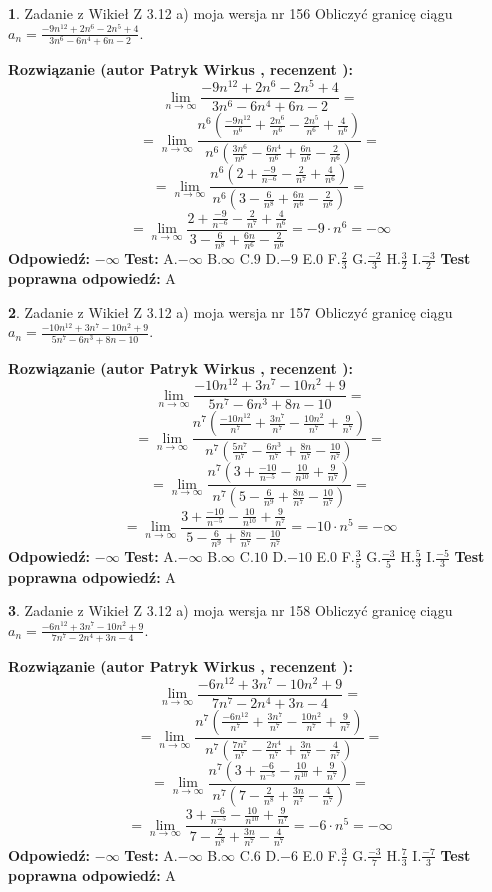 \documentclass[12pt, a4paper]{article}
\theoremstyle{definition} %
\newtheorem{zad}{}
\newcommand{\zadStart}[1]{\begin{zad}#1\newline}
\newcommand{\zadStop}{\end{zad}}
\newcommand{\rozwStart}[2]{\noindent \textbf{Rozwiązanie (autor #1 , recenzent #2): }\newline}
\newcommand{\rozwStop}{\newline}
\newcommand{\odpStart}{\noindent \textbf{Odpowiedź:}\newline}
\newcommand{\odpStop}{\newline}
\newcommand{\testStart}{\noindent \textbf{Test:}\newline}
\newcommand{\testStop}{\newline}
\newcommand{\kluczStart}{\noindent \textbf{Test poprawna odpowiedź:}\newline}
\newcommand{\kluczStop}{\newline}
\begin{document}
\zadStart{Zadanie z Wikieł Z 3.12 a) moja wersja nr 156}
Obliczyć granicę ciągu $a_{n}=\frac{-9n^{12}+2n^{6}-2n^{5}+4}{3n^{6}-6n^{4}+6n-2}$.
\zadStop
\rozwStart{Patryk Wirkus}{}
$$\lim\limits_{n\to\infty}\frac{-9n^{12}+2n^{6}-2n^{5}+4}{3n^{6}-6n^{4}+6n-2}=$$
$$=\lim\limits_{n\to\infty}\frac{n^{6}\left(\frac{-9n^{12}}{n^{6}}+\frac{2n^{6}}{n^{6}}-\frac{2n^{5}}{n^{6}}+\frac{4}{n^{6}}\right)}{n^{6}\left(\frac{3n^{6}}{n^{6}}-\frac{6n^{4}}{n^{6}}+\frac{6n}{n^{6}}-\frac{2}{n^{6}}\right)}=$$
$$=\lim\limits_{n\to\infty}\frac{n^{6}\left(2+\frac{-9}{n^{-6}}-\frac{2}{n^{7}}+\frac{4}{n^{6}}\right)}
{n^{6}\left(3-\frac{6}{n^{8}}+\frac{6n}{n^{6}}-\frac{2}{n^{6}}\right)}=$$
$$=\lim\limits_{n\to\infty}\frac{2+\frac{-9}{n^{-6}}-\frac{2}{n^{7}}+\frac{4}{n^{6}}}{3-\frac{6}{n^{8}}+\frac{6n}{n^{6}}-\frac{2}{n^{6}}}=-9\cdot n^{6} = -\infty$$
\rozwStop
\odpStart
$-\infty$
\odpStop
\testStart
A.$-\infty$
B.$\infty$
C.$9$
D.$-9$
E.$0$
F.$\frac{2}{3}$
G.$\frac{-2}{3}$
H.$\frac{3}{2}$
I.$\frac{-3}{2}$
\testStop
\kluczStart
A
\kluczStop



\zadStart{Zadanie z Wikieł Z 3.12 a) moja wersja nr 157}
Obliczyć granicę ciągu $a_{n}=\frac{-10n^{12}+3n^{7}-10n^{2}+9}{5n^{7}-6n^{3}+8n-10}$.
\zadStop
\rozwStart{Patryk Wirkus}{}
$$\lim\limits_{n\to\infty}\frac{-10n^{12}+3n^{7}-10n^{2}+9}{5n^{7}-6n^{3}+8n-10}=$$
$$=\lim\limits_{n\to\infty}\frac{n^{7}\left(\frac{-10n^{12}}{n^{7}}+\frac{3n^{7}}{n^{7}}-\frac{10n^{2}}{n^{7}}+\frac{9}{n^{7}}\right)}{n^{7}\left(\frac{5n^{7}}{n^{7}}-\frac{6n^{3}}{n^{7}}+\frac{8n}{n^{7}}-\frac{10}{n^{7}}\right)}=$$
$$=\lim\limits_{n\to\infty}\frac{n^{7}\left(3+\frac{-10}{n^{-5}}-\frac{10}{n^{10}}+\frac{9}{n^{7}}\right)}
{n^{7}\left(5-\frac{6}{n^{9}}+\frac{8n}{n^{7}}-\frac{10}{n^{7}}\right)}=$$
$$=\lim\limits_{n\to\infty}\frac{3+\frac{-10}{n^{-5}}-\frac{10}{n^{10}}+\frac{9}{n^{7}}}{5-\frac{6}{n^{9}}+\frac{8n}{n^{7}}-\frac{10}{n^{7}}}=-10\cdot n^{5} = -\infty$$
\rozwStop
\odpStart
$-\infty$
\odpStop
\testStart
A.$-\infty$
B.$\infty$
C.$10$
D.$-10$
E.$0$
F.$\frac{3}{5}$
G.$\frac{-3}{5}$
H.$\frac{5}{3}$
I.$\frac{-5}{3}$
\testStop
\kluczStart
A
\kluczStop



\zadStart{Zadanie z Wikieł Z 3.12 a) moja wersja nr 158}
Obliczyć granicę ciągu $a_{n}=\frac{-6n^{12}+3n^{7}-10n^{2}+9}{7n^{7}-2n^{4}+3n-4}$.
\zadStop
\rozwStart{Patryk Wirkus}{}
$$\lim\limits_{n\to\infty}\frac{-6n^{12}+3n^{7}-10n^{2}+9}{7n^{7}-2n^{4}+3n-4}=$$
$$=\lim\limits_{n\to\infty}\frac{n^{7}\left(\frac{-6n^{12}}{n^{7}}+\frac{3n^{7}}{n^{7}}-\frac{10n^{2}}{n^{7}}+\frac{9}{n^{7}}\right)}{n^{7}\left(\frac{7n^{7}}{n^{7}}-\frac{2n^{4}}{n^{7}}+\frac{3n}{n^{7}}-\frac{4}{n^{7}}\right)}=$$
$$=\lim\limits_{n\to\infty}\frac{n^{7}\left(3+\frac{-6}{n^{-5}}-\frac{10}{n^{10}}+\frac{9}{n^{7}}\right)}
{n^{7}\left(7-\frac{2}{n^{8}}+\frac{3n}{n^{7}}-\frac{4}{n^{7}}\right)}=$$
$$=\lim\limits_{n\to\infty}\frac{3+\frac{-6}{n^{-5}}-\frac{10}{n^{10}}+\frac{9}{n^{7}}}{7-\frac{2}{n^{8}}+\frac{3n}{n^{7}}-\frac{4}{n^{7}}}=-6\cdot n^{5} = -\infty$$
\rozwStop
\odpStart
$-\infty$
\odpStop
\testStart
A.$-\infty$
B.$\infty$
C.$6$
D.$-6$
E.$0$
F.$\frac{3}{7}$
G.$\frac{-3}{7}$
H.$\frac{7}{3}$
I.$\frac{-7}{3}$
\testStop
\kluczStart
A
\kluczStop
\end{document}
